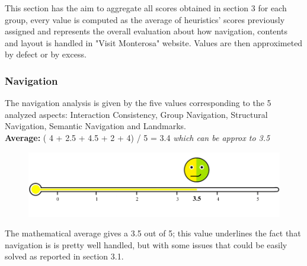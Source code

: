 This section has the aim to aggregate all scores obtained in section 3 for each group, every value is computed as the average of heuristics' scores previously assigned and represents the overall evaluation about how navigation, contents and layout  is handled in "Visit Monterosa" website. Values are then approximeted by defect or by excess.

\subsubsection*{Navigation}
The navigation analysis is given by the five values corresponding to the 5 analyzed aspects: Interaction Consistency, Group Navigation, Structural Navigation, Semantic Navigation and Landmarks.\\
\textbf{Average: } ( 4 + 2.5 + 4.5 + 2 + 4) / 5 = 3.4  \emph{which can be approx to 3.5}\\
\begin{figure}[h!]
	\centering
	\begin{minipage}[b]{1\textwidth}
    		\includegraphics[width=1\textwidth]{./assets/layout-navigation-value.png}
	\end{minipage}
\end{figure}
\FloatBarrier The mathematical average gives a 3.5 out of 5; this value underlines the fact that navigation is is pretty well handled, but with some issues that could be easily solved as reported in section 3.1.

